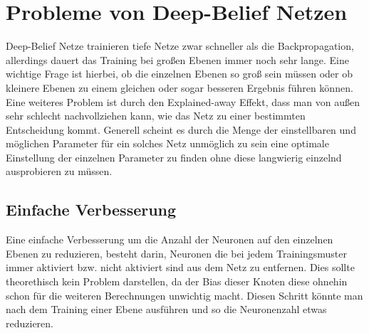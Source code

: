 \documentclass[12pt]{article}
\begin{document}
	\section{Probleme von Deep-Belief Netzen}
	Deep-Belief Netze trainieren tiefe Netze zwar schneller als die Backpropagation, allerdings dauert das Training bei großen Ebenen immer noch sehr lange. Eine wichtige Frage ist hierbei, ob die einzelnen Ebenen so groß sein müssen oder ob kleinere Ebenen zu einem gleichen oder sogar besseren Ergebnis führen können. Eine weiteres Problem ist durch den Explained-away Effekt, dass man von außen sehr schlecht nachvollziehen kann, wie das Netz zu einer bestimmten Entscheidung kommt. Generell scheint es durch die Menge der einstellbaren und möglichen Parameter für ein solches Netz unmöglich zu sein eine optimale Einstellung der einzelnen Parameter zu finden ohne diese langwierig einzelnd ausprobieren zu müssen. 

\subsection{Einfache Verbesserung}
Eine einfache Verbesserung um die Anzahl der Neuronen auf den einzelnen Ebenen zu reduzieren, besteht darin, Neuronen die bei jedem Trainingsmuster immer aktiviert bzw. nicht aktiviert sind aus dem Netz zu entfernen. Dies sollte theorethisch kein Problem darstellen, da der Bias dieser Knoten diese ohnehin schon für die weiteren Berechnungen unwichtig macht. Diesen Schritt könnte man nach dem Training einer Ebene ausführen und so die Neuronenzahl etwas reduzieren.
\end{document}
